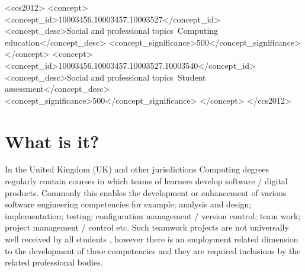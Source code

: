 \documentclass[sigconf, anonymous=true]{acmart}
\begin{document}
\begin{CCSXML}
<ccs2012>
   <concept>
       <concept_id>10003456.10003457.10003527</concept_id>
       <concept_desc>Social and professional topics~Computing education</concept_desc>
       <concept_significance>500</concept_significance>
       </concept>
   <concept>
       <concept_id>10003456.10003457.10003527.10003540</concept_id>
       <concept_desc>Social and professional topics~Student assessment</concept_desc>
       <concept_significance>500</concept_significance>
       </concept>
 </ccs2012>
\end{CCSXML}


\maketitle
\section{What is it?}	
\label{sec:What}
In the United Kingdom (UK) and other jurisdictions Computing degrees regularly contain courses in which teams of learners develop software / digital products. Commonly this enables the development or enhancement of various software engineering competencies for example; analysis and design; implementation; testing; configuration management / version control; team work; project management / control etc. Such teamwork projects are not universally well received by all students \cite{Gordon2010}, however there is an employment related dimension \cite{Thomas2003, Mitchell2021} to the development of these competencies and they are required inclusions by the related professional bodies\cite{Crick2020}. 
\end{document}

